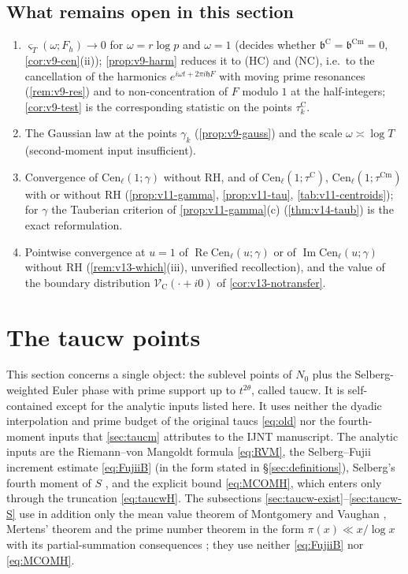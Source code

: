 \documentclass[11pt,a4paper]{article}
\numberwithin{equation}{section}
\theoremstyle{definition}
\theoremstyle{remark}
\newcommand{\Cm}{\mathrm{Cm}}
\begin{document}
\subsection{What remains open in this section}\label{sec:v9-open-centroid}
\begin{enumerate}[label=(\alph*),leftmargin=*]
\item $\varsigma_T(\omega;F_h)\to0$ for $\omega=r\log p$ and $\omega=1$ (decides whether $\mathfrak b^{\mathrm C}=\mathfrak b^{\Cm}=0$, \cref{cor:v9-cen}(ii)); \cref{prop:v9-harm} reduces it to (HC) and (NC), i.e.\ to the cancellation of the harmonics $e^{i\omega t+2\pi i\mathfrak hF}$ with moving prime resonances (\cref{rem:v9-res}) and to non-concentration of $F$ modulo $1$ at the half-integers; \cref{cor:v9-test} is the corresponding statistic on the points $\tau_k^{\mathrm C}$.
\item The Gaussian law at the points $\gamma_k$ (\cref{prop:v9-gauss}) and the scale $\omega\asymp\log T$ (second-moment input insufficient).
\item Convergence of $\mathrm{Cen}_\ell(1;\gamma)$ without RH, and of $\mathrm{Cen}_\ell(1;\tau^{\mathrm C})$, $\mathrm{Cen}_\ell(1;\tau^{\Cm})$ with or without RH (\cref{prop:v11-gamma}, \cref{prop:v11-tau}, \cref{tab:v11-centroids}); for $\gamma$ the Tauberian criterion of \cref{prop:v11-gamma}(c) (\cref{thm:v14-taub}) is the exact reformulation.
\item Pointwise convergence at $u=1$ of $\operatorname{Re}\mathrm{Cen}_\ell(u;\gamma)$ or of $\operatorname{Im}\mathrm{Cen}_\ell(u;\gamma)$ without RH (\cref{rem:v13-which}(iii), unverified recollection), and the value of the boundary distribution $\mathscr V_{\mathrm C}(\cdot+i0)$ of \cref{cor:v13-notransfer}.
\end{enumerate}

\section{The taucw points}\label{sec:taucw}
This section concerns a single object: the sublevel points of $N_0$ plus the Selberg-weighted Euler phase with prime support up to $t^{2\theta}$, called taucw. It is self-contained except for the analytic inputs listed here. It uses neither the dyadic interpolation and prime budget of the original taucs \eqref{eq:old} nor the fourth-moment inputs that \cref{sec:taucm} attributes to the IJNT manuscript. The analytic inputs are the Riemann--von Mangoldt formula \eqref{eq:RVM}, the Selberg--Fujii increment estimate \eqref{eq:FujiiB} (in the form stated in \S\ref{sec:definitions}), Selberg's fourth moment of $S$ \cite{Selberg1946,Titchmarsh}, and the explicit bound \eqref{eq:MCOMH}, which enters only through the truncation \eqref{eq:taucwH}. The subsections \ref{sec:taucw-exist}--\ref{sec:taucw-S} use in addition only the mean value theorem of Montgomery and Vaughan \cite{MontgomeryVaughan}, Mertens' theorem \cite{Mertens1874} and the prime number theorem in the form $\pi(x)\ll x/\log x$ with its partial-summation consequences \cite{Davenport2000}; they use neither \eqref{eq:FujiiB} nor \eqref{eq:MCOMH}.
\end{document}
